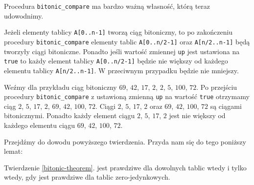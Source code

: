 Procedura \texttt{bitonic\_compare} ma bardzo ważną własność, którą teraz udowodnimy.

\begin{theorem}
 Jeżeli elementy tablicy \texttt{A[0..n-1]} tworzą ciąg bitoniczny, to po zakończeniu procedury \texttt{bitonic\_compare} elementy tablic \texttt{A[0..n/2-1]} oraz \texttt{A[n/2..n-1]} będą tworzyły ciągi bitoniczne.
 Ponadto jeśli wartość zmiennej \texttt{up} jest ustawiona na \texttt{true} to każdy element tablicy \texttt{A[0..n/2-1]} będzie nie większy od każdego elementu tablicy \texttt{A[n/2..n-1]}.
 W przeciwnym przypadku będzie nie mniejszy.
 \label{bitonic-theorem}
\end{theorem}

Weźmy dla przykładu ciąg bitoniczny $69$, $42$, $17$, $2$, $2$, $5$, $100$, $72$.
Po przejściu procedury \texttt{bitonic\_compare} z ustawioną zmienną \texttt{up} na wartość \texttt{true} otrzymamy ciąg $2$, $5$, $17$, $2$, $69$, $42$, $100$, $72$.
Ciągi $2$, $5$, $17$, $2$ oraz $69$, $42$, $100$, $72$ są ciągami bitonicznymi.
Ponadto każdy element ciągu $2$, $5$, $17$, $2$ jest nie większy od każdego elementu ciągu $69$, $42$, $100$, $72$.

Przejdźmy do dowodu powyższego twierdzenia.
Przyda nam się do tego poniższy lemat:

\begin{lemma}
 Twierdzenie \ref{bitonic-theorem}. jest prawdziwe dla dowolnych tablic wtedy i tylko wtedy, gdy jest prawdziwe dla tablic zero-jedynkowych.
 \label{zero-one-lemma}
\end{lemma}

